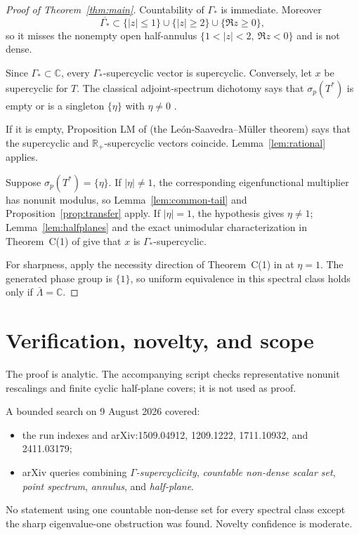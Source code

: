 \documentclass[11pt]{article}
\theoremstyle{definition}
\newcommand{\C}{\mathbb C}
\newcommand{\Gamstar}{\Gamma_{\!*}}
\begin{document}
\begin{proof}[Proof of Theorem~\ref{thm:main}]
Countability of $\Gamstar$ is immediate.  Moreover
\[
 \overline{\Gamstar}\subset
 \{|z|\leq1\}\cup\{|z|\geq2\}\cup\{\Re z\geq0\},
\]
so it misses the nonempty open half-annulus
$\{1<|z|<2,\ \Re z<0\}$ and is not dense.

Since $\Gamstar\subset\C$, every $\Gamstar$-supercyclic vector is
supercyclic.  Conversely, let $x$ be supercyclic for $T$.  The classical
adjoint-spectrum dichotomy says that $\sigma_p(T^*)$ is empty or is a
singleton $\{\eta\}$ with $\eta\ne0$ \cite{Shkarin}.

If it is empty, Proposition LM of \cite{Shkarin} (the
Le\'on-Saavedra--M\"uller theorem) says that the supercyclic and
$\mathbb R_+$-supercyclic vectors coincide.  Lemma~\ref{lem:rational}
applies.

Suppose $\sigma_p(T^*)=\{\eta\}$.  If $|\eta|\ne1$, the corresponding
eigenfunctional multiplier has nonunit modulus, so
Lemma~\ref{lem:common-tail} and Proposition~\ref{prop:transfer} apply.  If
$|\eta|=1$, the hypothesis gives $\eta\ne1$; Lemma~\ref{lem:halfplanes}
and the exact unimodular characterization in Theorem~C(1) of \cite{CEM}
give that $x$ is $\Gamstar$-supercyclic.

For sharpness, apply the necessity direction of Theorem~C(1) in \cite{CEM}
at $\eta=1$.  The generated phase group is $\{1\}$, so uniform equivalence
in this spectral class holds only if $\overline\Lambda=\C$.
\end{proof}

\section{Verification, novelty, and scope}

The proof is analytic.  The accompanying script checks representative
nonunit rescalings and finite cyclic half-plane covers; it is not used as
proof.

A bounded search on 9 August 2026 covered:
\begin{itemize}[nosep,leftmargin=1.4em]
\item the run indexes and arXiv:1509.04912, 1209.1222, 1711.10932, and
  2411.03179;
\item arXiv queries combining \emph{$\Gamma$-supercyclicity},
  \emph{countable non-dense scalar set}, \emph{point spectrum},
  \emph{annulus}, and \emph{half-plane}.
\end{itemize}
No statement using one countable non-dense set for every spectral class
except the sharp eigenvalue-one obstruction was found.  Novelty confidence
is moderate.
\end{document}
